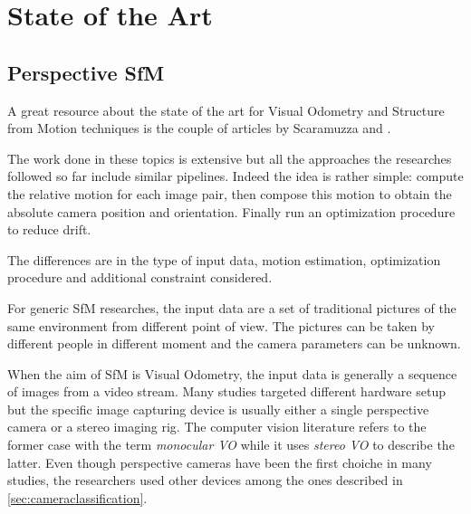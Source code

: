 \chapter{State of the Art}
\section{Perspective SfM}
A great resource about the state of the art for Visual Odometry and Structure 
from Motion techniques is the couple of articles by Scaramuzza 
\cite{scaramuzzaVisualOdometryI} and \cite{scaramuzzaVisualOdometryII}.

The work done in these topics is extensive but all the approaches the 
researches followed so far include similar pipelines.
Indeed the idea is rather simple: compute the relative motion for each image
pair, then compose this motion to obtain the absolute camera position and 
orientation. Finally run an optimization procedure to reduce drift.

The differences are in the type of input data, motion estimation, optimization 
procedure and additional constraint considered.

For generic SfM researches, the input data are a set of traditional pictures of 
the same environment from different point of view. The pictures can be taken by 
different people in different moment and the camera parameters can be unknown.

When the aim of SfM is Visual Odometry, the input data is generally a sequence 
of images from a video stream. Many studies targeted different hardware setup 
but the specific image capturing device is usually either a single perspective 
camera or a stereo imaging rig. The computer vision literature refers to the
former case with the term \textit{monocular VO} while it uses \textit{stereo VO}
to describe the latter.
Even though perspective cameras have been the first choiche in many studies, 
the researchers used other devices among the ones described in 
\ref{sec:cameraclassification}.


